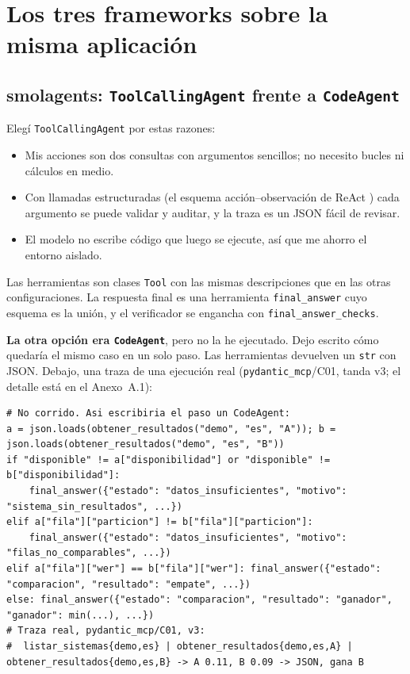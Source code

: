 \documentclass[10pt,a4paper]{article}
\newcommand{\cod}[1]{\texttt{\small #1}}
\begin{document}
\section{Los tres frameworks sobre la misma aplicación}
\subsection{smolagents: \texttt{ToolCallingAgent} frente a \texttt{CodeAgent}}\label{sec:smol}
Elegí \cod{ToolCallingAgent} \cite{smolagents,smoldocs} por estas razones:
\begin{itemize}
\item Mis acciones son dos consultas con argumentos sencillos; no necesito bucles ni cálculos en medio.
\item Con llamadas estructuradas (el esquema acción--observación de ReAct \cite{react}) cada argumento se puede validar y auditar, y la traza es un JSON fácil de revisar.
\item El modelo no escribe código que luego se ejecute, así que me ahorro el entorno aislado.
\end{itemize}
Las herramientas son clases \cod{Tool} con las mismas descripciones que en las otras configuraciones. La respuesta final es una herramienta \cod{final\_answer} cuyo esquema es la unión, y el verificador se engancha con \cod{final\_answer\_checks}.

\textbf{La otra opción era \cod{CodeAgent}}, pero no la he ejecutado. Dejo escrito cómo quedaría el mismo caso en un solo paso. Las herramientas devuelven un \cod{str} con JSON. Debajo, una traza de una ejecución real (\cod{pydantic\_mcp}/C01, tanda v3; el detalle está en el Anexo~A.1):
\begin{lstlisting}
# No corrido. Asi escribiria el paso un CodeAgent:
a = json.loads(obtener_resultados("demo", "es", "A")); b = json.loads(obtener_resultados("demo", "es", "B"))
if "disponible" != a["disponibilidad"] or "disponible" != b["disponibilidad"]:
    final_answer({"estado": "datos_insuficientes", "motivo": "sistema_sin_resultados", ...})
elif a["fila"]["particion"] != b["fila"]["particion"]:
    final_answer({"estado": "datos_insuficientes", "motivo": "filas_no_comparables", ...})
elif a["fila"]["wer"] == b["fila"]["wer"]: final_answer({"estado": "comparacion", "resultado": "empate", ...})
else: final_answer({"estado": "comparacion", "resultado": "ganador", "ganador": min(...), ...})
# Traza real, pydantic_mcp/C01, v3:
#  listar_sistemas{demo,es} | obtener_resultados{demo,es,A} | obtener_resultados{demo,es,B} -> A 0.11, B 0.09 -> JSON, gana B
\end{lstlisting}
\end{document}
